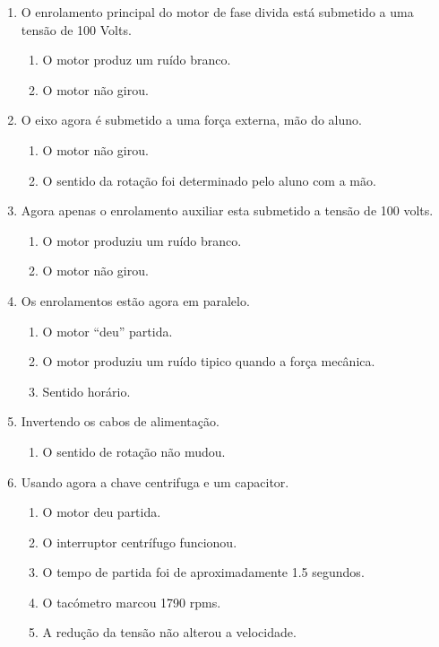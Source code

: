 \documentclass[paper=a4, fontsize=11pt]{article}
\begin{document}
\begin{enumerate}
    \item O enrolamento principal do motor de fase divida está submetido 
            a uma tensão de 100 Volts. 
            \begin{enumerate}
                \item O motor produz um ruído branco.
                \item O motor não girou.
            \end{enumerate}

    \item O eixo agora é submetido a uma força externa, mão do aluno.
            \begin{enumerate}
                    \item O motor não girou.
                    \item O sentido da rotação foi determinado pelo aluno com a mão.
            \end{enumerate}

    \item Agora apenas o enrolamento auxiliar esta submetido a tensão de 100 volts.
            \begin{enumerate}
        \item O motor produziu um ruído branco.
        \item O motor não girou.
            \end{enumerate}

    \item Os enrolamentos estão agora em paralelo.
            \begin{enumerate}
                    \item O motor ``deu'' partida.
                    \item O motor produziu um ruído tipico quando a força mecânica.
                    \item Sentido horário.
            \end{enumerate}

    \item Invertendo os cabos de alimentação.
        \begin{enumerate}
            \item O sentido de rotação não mudou.
        \end{enumerate}

\item Usando agora a chave centrifuga e um capacitor.

        \begin{enumerate}
            \item O motor deu partida.
            \item O interruptor centrífugo funcionou.
            \item O tempo de partida foi de aproximadamente 1.5 segundos.
            \item O tacómetro marcou 1790 rpms.
            \item A redução da tensão não alterou a velocidade.
            


\end{enumerate}
\end{enumerate}
\end{document}
